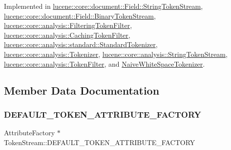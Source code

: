 Implemented in \mbox{\hyperlink{classlucene_1_1core_1_1document_1_1Field_1_1StringTokenStream_a36e021820bb6ed2984c4f34f2f41a470}{lucene\+::core\+::document\+::\+Field\+::\+String\+Token\+Stream}}, \mbox{\hyperlink{classlucene_1_1core_1_1document_1_1Field_1_1BinaryTokenStream_adc2b2b0a6ea02054dfe5159628861911}{lucene\+::core\+::document\+::\+Field\+::\+Binary\+Token\+Stream}}, \mbox{\hyperlink{classlucene_1_1core_1_1analysis_1_1FilteringTokenFilter_ab85e4deab22d9dedd7ccb7b1f4750400}{lucene\+::core\+::analysis\+::\+Filtering\+Token\+Filter}}, \mbox{\hyperlink{classlucene_1_1core_1_1analysis_1_1CachingTokenFilter_adde877fb8c464d6eb2766bd400a1499c}{lucene\+::core\+::analysis\+::\+Caching\+Token\+Filter}}, \mbox{\hyperlink{classlucene_1_1core_1_1analysis_1_1standard_1_1StandardTokenizer_a4d6e42ca0fcaf07cb6615643362891b3}{lucene\+::core\+::analysis\+::standard\+::\+Standard\+Tokenizer}}, \mbox{\hyperlink{classlucene_1_1core_1_1analysis_1_1Tokenizer_a459d9c95a28f3b8aa3ad1cfde1568dd3}{lucene\+::core\+::analysis\+::\+Tokenizer}}, \mbox{\hyperlink{classlucene_1_1core_1_1analysis_1_1StringTokenStream_ab578e75921eb1757b4a8887cf29fe94d}{lucene\+::core\+::analysis\+::\+String\+Token\+Stream}}, \mbox{\hyperlink{classlucene_1_1core_1_1analysis_1_1TokenFilter_a0671ee825db7735a7b72b7a27a457ed9}{lucene\+::core\+::analysis\+::\+Token\+Filter}}, and \mbox{\hyperlink{classNaiveWhiteSpaceTokenizer_aa532e6a3e2fa6a9ebb90a4324179a30f}{Naive\+White\+Space\+Tokenizer}}.



\subsection{Member Data Documentation}
\mbox{\label{classlucene_1_1core_1_1analysis_1_1TokenStream_a3a38785c7907943994326cb9d7180671}} 
\subsubsection{\texorpdfstring{D\+E\+F\+A\+U\+L\+T\+\_\+\+T\+O\+K\+E\+N\+\_\+\+A\+T\+T\+R\+I\+B\+U\+T\+E\+\_\+\+F\+A\+C\+T\+O\+RY}{DEFAULT\_TOKEN\_ATTRIBUTE\_FACTORY}}
{\footnotesize\ttfamily Attribute\+Factory $\ast$ Token\+Stream\+::\+D\+E\+F\+A\+U\+L\+T\+\_\+\+T\+O\+K\+E\+N\+\_\+\+A\+T\+T\+R\+I\+B\+U\+T\+E\+\_\+\+F\+A\+C\+T\+O\+RY\hspace{0.3cm}{\ttfamily [static]}}

